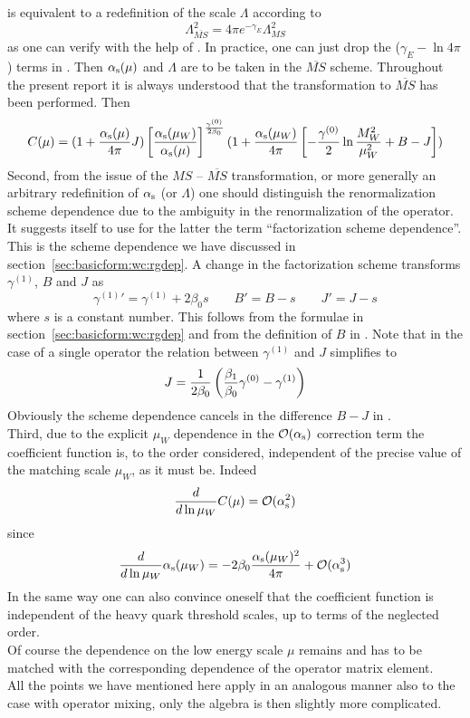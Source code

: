  is equivalent to a redefinition of the scale $\Lambda$
according to
\begin{equation}\label{msbl}
\Lambda^2_{\overline{MS}}=4\pi e^{-\gamma_E}\Lambda^2_{MS}  \end{equation}
as one can verify with the help of . In practice, one can
just drop the ($\gamma_E-\ln 4\pi$) terms in . Then $\alpha_{\rm s}(\mu)$
and $\Lambda$ are to be taken in the $\overline{MS}$ scheme.
Throughout the present report it is always understood that the
transformation to $\overline{MS}$ has been performed. Then
\begin{equation}\label{msbc}
 C(\mu)=(1+{\alpha_{\rm s}(\mu)\over 4\pi}J)\left[{\alpha_{\rm s}(\mu_W)\over\alpha_{\rm s}(\mu)}\right]^{
  \gamma^{(0)}\over 2\beta_0}
 (1+{\alpha_{\rm s}(\mu_W)\over 4\pi}\left[-{\gamma^{(0)}\over 2}
 \ln{M^2_W\over\mu^2_W}+B-J\right]) \end{equation}
Second, from the issue of the $MS$ -- $\overline{MS}$ transformation,
or more generally an arbitrary redefinition of $\alpha_{\rm s}$ (or $\Lambda$) one
should distinguish the renormalization scheme dependence due to the
ambiguity in the renormalization of the operator.  It suggests itself
to use for the latter the term ``factorization scheme dependence''.
This is the scheme dependence we have discussed in
section~\ref{sec:basicform:wc:rgdep}. A change in the factorization
scheme transforms $\gamma^{(1)}$, $B$ and $J$ as
\begin{equation}\label{gbjs}
{\gamma^{(1)}}'=\gamma^{(1)} + 2\beta_0 s
\qquad B'=B - s
\qquad J'=J - s
\end{equation}
where $s$ is a constant number. This follows from the formulae in
section~\ref{sec:basicform:wc:rgdep} and from the definition of $B$ in
. Note that in the case of a single operator the relation
between $\gamma^{(1)}$ and $J$ simplifies to
\begin{equation}\label{jg01}
J={1\over 2\beta_0}\left({\beta_1\over\beta_0}\gamma^{(0)}
  -\gamma^{(1)}\right)   \end{equation}
Obviously the scheme dependence cancels in the difference
$B-J$ in .\\
Third, due to the explicit $\mu_W$ dependence in the ${\cal O}(\alpha_{\rm s})$
correction term the coefficient function is, to the order considered,
independent of the precise value of the matching scale $\mu_W$, as it
must be. Indeed
\begin{equation}\label{cmud}
{d\over d\ln\mu_W}C(\mu)={\cal O}(\alpha_{\rm s}^2)  \end{equation}
since
\begin{equation}\label{amud}
{d\over d\ln\mu_W}\alpha_{\rm s}(\mu_W)=-2\beta_0{\alpha_{\rm s}(\mu_W)^2\over 4\pi}+{\cal O}(\alpha_{\rm s}^3)\end{equation}
In the same way one can also convince oneself that the coefficient
function is independent of the heavy quark threshold scales, up to
terms of the neglected order.\\
Of course the dependence on the low energy scale $\mu$ remains
and has to be matched with the corresponding dependence of the
operator matrix element.\\
All the points we have mentioned here apply in an analogous
manner also to the case with operator mixing, only the algebra is
then slightly more complicated.

